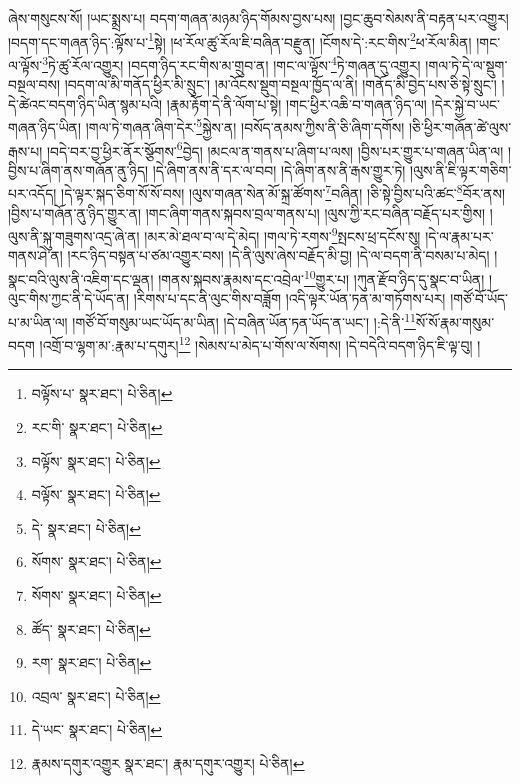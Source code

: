 ཞེས་གསུངས་སོ། །ཡང་སྨྲས་པ། བདག་གཞན་མཉམ་ཉིད་གོམས་བྱས་པས། །བྱང་ཆུབ་སེམས་ནི་བརྟན་པར་འགྱུར། །བདག་དང་གཞན་ཉིད་:ལྟོས་པ་\footnote{བལྟོས་པ་  སྣར་ཐང་།  པེ་ཅིན། }སྟེ། །ཕ་རོལ་ཚུ་རོལ་ཇི་བཞིན་བརྫུན། །ངོགས་དེ་:རང་གིས་\footnote{རང་གི་  སྣར་ཐང་།  པེ་ཅིན། }ཕ་རོལ་མིན། །གང་ལ་ལྟོས་\footnote{བལྟོས་  སྣར་ཐང་།  པེ་ཅིན། }ཏེ་ཚུ་རོལ་འགྱུར། །བདག་ཉིད་རང་གིས་མ་གྲུབ་ན། །གང་ལ་ལྟོས་\footnote{བལྟོས་  སྣར་ཐང་།  པེ་ཅིན། }ཏེ་གཞན་དུ་འགྱུར། །གལ་ཏེ་དེ་ལ་སྡུག་བསྔལ་བས། །བདག་ལ་མི་གནོད་ཕྱིར་མི་སྲུང་། །མ་འོངས་སྡུག་བསྔལ་ཁྱོད་ལ་ནི། །གནོད་མི་བྱེད་པས་ཅི་སྟེ་སྲུང་། །དེ་ཚེའང་བདག་ཉིད་ཡིན་སྙམ་པའི། །རྣམ་རྟོག་དེ་ནི་ལོག་པ་སྟེ། །གང་ཕྱིར་འཆི་བ་གཞན་ཉིད་ལ། །དེར་སྐྱེ་བ་ཡང་གཞན་ཉིད་ཡིན། །གལ་ཏེ་གཞན་ཞིག་དེར་\footnote{དེ་  སྣར་ཐང་།  པེ་ཅིན། }སྐྱེས་ན། །བསོད་ནམས་ཀྱིས་ནི་ཅི་ཞིག་དགོས། །ཅི་ཕྱིར་གཞོན་ཚེ་ལུས་རྒས་པ། །བདེ་བར་བྱ་ཕྱིར་ནོར་སྩོགས་\footnote{སོགས་  སྣར་ཐང་།  པེ་ཅིན། }བྱེད། །མངལ་ན་གནས་པ་ཞིག་པ་ལས། །བྱིས་པར་གྱུར་པ་གཞན་ཡིན་ལ། །བྱིས་པ་ཞིག་ནས་གཞོན་ནུ་ཉིད། །དེ་ཞིག་ནས་ནི་དར་ལ་བབ། །དེ་ཞིག་ནས་ནི་རྒས་གྱུར་ཏེ། །ལུས་ནི་ཇི་ལྟར་གཅིག་པར་འདོད། །དེ་ལྟར་སྐད་ཅིག་སོ་སོ་བས། །ལུས་གཞན་སེན་མོ་སྐྲ་ཚོགས་\footnote{སོགས་  སྣར་ཐང་།  པེ་ཅིན། }བཞིན། །ཅི་སྟེ་བྱིས་པའི་ཚང་\footnote{ཚོད་  སྣར་ཐང་།  པེ་ཅིན། }བོར་ནས། །བྱིས་པ་གཞོན་ནུ་ཉིད་གྱུར་ན། །གང་ཞིག་གནས་སྐབས་བྲལ་གནས་པ། །ལུས་ཀྱི་རང་བཞིན་བརྗོད་པར་གྱིས། །ལུས་ནི་སྐུ་གཟུགས་འདྲ་ཞེ་ན། །མར་མེ་ཐལ་བ་ལ་དེ་མེད། །གལ་ཏེ་རགས་\footnote{རག་  སྣར་ཐང་།  པེ་ཅིན། }སྤངས་ཕྲ་དངོས་སུ། །དེ་ལ་རྣམ་པར་གནས་ཤེ་ན། །རང་ཉིད་བསྟན་པ་ཙམ་འགྱུར་བས། །དེ་ནི་ལུས་ཞེས་བརྗོད་མི་བྱ། །དེ་ལ་བདག་ནི་བསམ་པ་མེད། །སྣང་བའི་ལུས་ནི་འཇིག་དང་ལྡན། །གནས་སྐབས་རྣམས་དང་འབྲེལ་\footnote{འབྲལ་  སྣར་ཐང་།  པེ་ཅིན། }གྱུར་པ། །ཀུན་རྫོབ་ཉིད་དུ་སྣང་བ་ཡིན། །ལུང་གིས་ཀྱང་ནི་དེ་ཡོད་ན། །རིགས་པ་དང་ནི་ལུང་གིས་བཟློག །འདི་ལྟར་ཡོན་ཏན་མ་གཏོགས་པར། །གཙོ་བོ་ཡོད་པ་མ་ཡིན་ལ། །གཙོ་བོ་གསུམ་ཡང་ཡོད་མ་ཡིན། །དེ་བཞིན་ཡོན་ཏན་ཡོད་ན་ཡང་། །:དེ་ནི་\footnote{དེ་ཡང་  སྣར་ཐང་།  པེ་ཅིན། }སོ་སོ་རྣམ་གསུམ་བདག །འགྲོ་བ་ལྷག་མ་:རྣམ་པ་དགུར།\footnote{རྣམས་དགུར་འགྱུར  སྣར་ཐང་། རྣམ་དགུར་འགྱུར།  པེ་ཅིན། } །སེམས་པ་མེད་པ་གོས་ལ་སོགས། །དེ་བདེའི་བདག་ཉིད་ཇི་ལྟ་བུ། །
